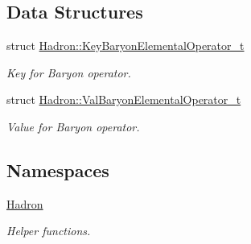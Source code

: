 \subsection*{Data Structures}
\begin{DoxyCompactItemize}
\item 
struct \mbox{\hyperlink{structHadron_1_1KeyBaryonElementalOperator__t}{Hadron\+::\+Key\+Baryon\+Elemental\+Operator\+\_\+t}}
\begin{DoxyCompactList}\small\item\em Key for Baryon operator. \end{DoxyCompactList}\item 
struct \mbox{\hyperlink{structHadron_1_1ValBaryonElementalOperator__t}{Hadron\+::\+Val\+Baryon\+Elemental\+Operator\+\_\+t}}
\begin{DoxyCompactList}\small\item\em Value for Baryon operator. \end{DoxyCompactList}\end{DoxyCompactItemize}
\subsection*{Namespaces}
\begin{DoxyCompactItemize}
\item 
 \mbox{\hyperlink{namespaceHadron}{Hadron}}
\begin{DoxyCompactList}\small\item\em Helper functions. \end{DoxyCompactList}\end{DoxyCompactItemize}
